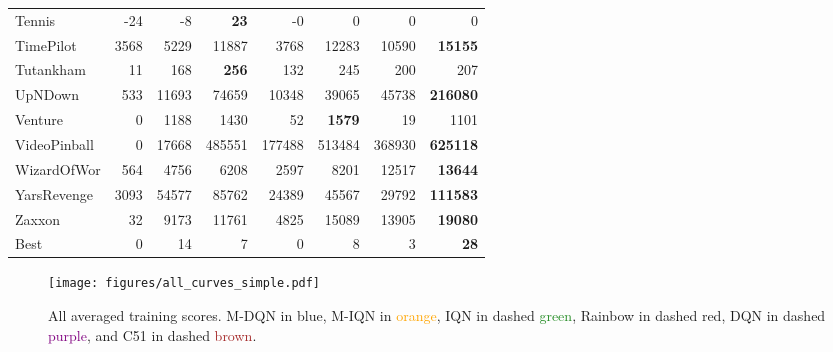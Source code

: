 \documentclass{article}
\begin{document}
\begin{table}
\begin{tabular}{l r r r r r r r}
Tennis&-24&-8&\textbf{23}&-0&0&0&0\\
TimePilot&3568&5229&11887&3768&12283&10590&\textbf{15155}\\
Tutankham&11&168&\textbf{256}&132&245&200&207\\
UpNDown&533&11693&74659&10348&39065&45738&\textbf{216080}\\
Venture&0&1188&1430&52&\textbf{1579}&19&1101\\
VideoPinball&0&17668&485551&177488&513484&368930&\textbf{625118}\\
WizardOfWor&564&4756&6208&2597&8201&12517&\textbf{13644}\\
YarsRevenge&3093&54577&85762&24389&45567&29792&\textbf{111583}\\
Zaxxon&32&9173&11761&4825&15089&13905&\textbf{19080}\\
\midrule
Best&0&14&7&0&8&3&\textbf{28}\\
\bottomrule
    \end{tabular}
    \label{tab:score_all}
\end{table}

\begin{figure}
\begin{center}
\texttt{[image: figures/all\_curves\_simple.pdf]}
\caption{All averaged training scores. M-DQN in \textcolor{NavyBlue}{blue}, M-IQN in \textcolor{Orange}{orange}, IQN in dashed \textcolor{ForestGreen}{green}, Rainbow in dashed \textcolor{BrickRed}{red}, DQN in dashed \textcolor{Purple}{purple}, and C51 in dashed \textcolor{Brown}{brown}.\label{fig:full}}
\end{center}
\end{figure}
\end{document}
